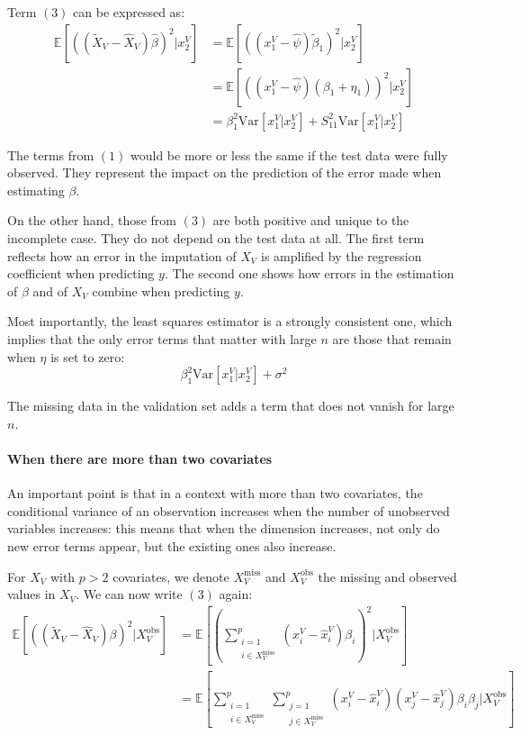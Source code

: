 Term $(3)$ can be expressed as:
\begin{align*}
\mathbb{E}[((\tilde{X}_V - \hat{X}_V) \hat{\beta})^2 \vert x^V_2]&= \mathbb{E}[((x^V_1 - \hat{\psi})\tilde{\beta}_1)^2 \vert x^V_2] \\
									 &= \mathbb{E}[((x^V_1 - \hat{\psi})(\beta_1 + \eta_1))^2 \vert x^V_2] \\
									&= \beta_1^2 \text{Var}[x^V_1 \vert x^V_2] + S_{11}^2 \text{Var}[x^V_1 \vert x^V_2] 
\end{align*}

The terms from $(1)$ would be more or less the same if the test data were fully observed. They represent the impact on the prediction of the error made when estimating $\beta$.

 On the other hand, those from $(3)$ are both positive and unique to the incomplete case. They do not depend on the test data at all. The first term reflects how an error in the imputation of $X_V$ is amplified by the regression coefficient when predicting $y$. The second one shows how errors in the estimation of $\beta$ and of $X_V$ combine when predicting $y$.
 
 Most importantly, the least squares estimator is a strongly consistent one\cite{consistency_linreg}, which implies that the only error terms that matter with large $n$ are those that remain when $\eta$ is set to zero:
 $$ \beta_1^2 \text{Var}[x^V_1 \vert x^V_2] + \sigma^2 $$
 
 The missing data in the validation set adds a term that does not vanish for large $n$.
 
 \paragraph*{When there are more than two covariates}
 An important point is that in a context with more than two covariates, the conditional variance of an observation increases when the number of unobserved variables increases: this means that when the dimension increases, not only do new error terms appear, but the existing ones also increase.
 
 For $X_V$ with $p>2$ covariates, we denote $X_V^{\text{miss}}$ and $X_V^{\text{obs}}$ the missing and observed values in $X_V$. We can now write $(3)$ again:
 \begin{align*}
 \mathbb{E}[((\tilde{X}_V - \hat{X}_V)\beta)^2 \vert X_V^{\text{obs}}] &= 
 		\mathbb{E}[ (\sum \limits_{\substack{i=1 \\i \in X_V^{\text{miss}}}}^{p} (x_i^V - \hat{x}_i^V)\beta_i)^2 \vert X_V^{\text{obs}}] \\
 		&= \mathbb{E}[\sum \limits_{\substack{i=1 \\i \in X_V^{\text{miss}}}}^{p} \sum \limits_{\substack{j=1 \\j \in X_V^{\text{miss}}}}^{p}
 			(x^V_i - \hat{x}^V_i)(x^V_j - \hat{x}^V_j)\beta_i \beta_j \vert X_V^{\text{obs}}]
 \end{align*}
 

